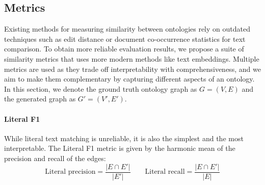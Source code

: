 
\subsection{Metrics}

Existing methods for measuring similarity between ontologies rely on outdated techniques such as edit distance or document co-occurrence statistics for text comparison. To obtain more reliable evaluation results, we propose a suite of similarity metrics that uses more modern methods like text embeddings. Multiple metrics are used as they trade off interpretability with comprehensiveness, and we aim to make them complementary by capturing different aspects of an ontology. In this section, we denote the ground truth ontology graph as $G = (V, E)$ and the generated graph as $G' = (V', E')$.

\paragraph{Literal F1 \cite{Kashyap2005TaxaMinerAE}}
While literal text matching is unreliable, it is also the simplest and the most interpretable. The Literal F1 metric is given by the harmonic mean of the precision and recall of the edges:
\[
    \text{Literal precision} = \frac{|E \cap E'|}{|E'|} \qquad
    \text{Literal recall} = \frac{|E \cap E'|}{|E|}
\]

